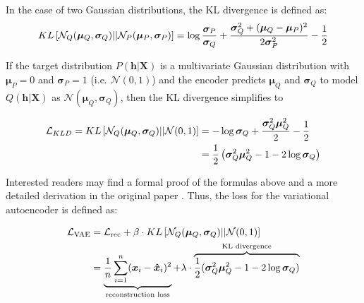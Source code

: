 In the case of two Gaussian distributions, the KL divergence is defined as:
\begin{equation}\eqlbl{hso_4}
	KL\left[ \mathcal{N}_Q(\boldsymbol{\mu}_Q, \boldsymbol{\sigma}_Q)||\mathcal{N}_P(\boldsymbol{\mu}_P, \boldsymbol{\sigma}_P) \right] = \log \frac{\boldsymbol{\sigma}_P}{\boldsymbol{\sigma}_Q} + \frac{\boldsymbol{\sigma}_Q^2 + (\boldsymbol{\mu}_Q-\boldsymbol{\mu}_P)^2}{2\boldsymbol{\sigma}_P^2} - \frac{1}{2}
\end{equation}


If the target distribution $P(\boldsymbol{h}|\boldsymbol{X})$ is a multivariate Gaussian distribution with $\boldsymbol{\mu}_P = 0$ and $\boldsymbol{\sigma}_P=1$ (i.e. $\mathcal{N}(0, 1)$) and the encoder predicts $\boldsymbol{\mu}_Q$ and $\boldsymbol{\sigma}_Q$ to model $Q(\boldsymbol{h}|\boldsymbol{X})$ as $\mathcal{N}(\boldsymbol{\mu}_Q, \boldsymbol{\sigma}_Q)$, then the KL divergence simplifies to


\begin{equation*}\eqlbl{hso_5}
\begin{split}
		\mathcal{L}_{KLD} = KL \left[ \mathcal{N}_Q(\boldsymbol{\mu}_Q, \boldsymbol{\sigma}_Q)||\mathcal{N}(0, 1) \right] & = -\log \boldsymbol{\sigma}_Q + \frac{\boldsymbol{\sigma}_Q^2 \boldsymbol{\mu}_Q^2}{2} - \frac{1}{2} \\
		 & = \frac{1}{2} \left( \boldsymbol{\sigma}_Q^2 \boldsymbol{\mu}_Q^2 - 1 - 2\log \boldsymbol{\sigma}_Q \right)
\end{split}
\end{equation*}

Interested readers may find a formal proof of the formulas above and a more detailed derivation in the original paper \cite{Kingma_Welling_2014}.
Thus, the loss for the variational autoencoder is defined as:


\begin{equation*}\eqlbl{hso_6}
\begin{split}
		\mathcal{L}_{\text{VAE}} & = \mathcal{L}_{\text{rec}} + \beta \cdot KL \left[ \mathcal{N}_Q(\boldsymbol{\mu}_Q, \boldsymbol{\sigma}_Q)||\mathcal{N}(0, 1) \right] \\
		  & = \underbrace{\frac{1}{n} \sum_{i=1}^{n} (\boldsymbol{x}_i - \boldsymbol{\hat{x}}_i)^2}_{\text{reconstruction loss}} + \lambda \cdot \overbrace{\frac{1}{2} (\boldsymbol{\sigma}_Q^2 \boldsymbol{\mu}_Q^2 - 1 - 2\log \boldsymbol{\sigma}_Q)}^{\text{KL divergence}}
\end{split}
\end{equation*}

